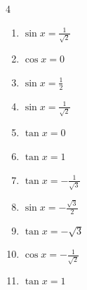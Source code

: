 \begin{multicols}{4}
\begin{enumerate}

  \item $\displaystyle \sin{x}  = \frac{1}{\sqrt{2}}$


  \item $\displaystyle \cos{x}  = 0$


  \item $\displaystyle \sin{x}  = \frac{1}{2}$


  \item $\displaystyle \sin{x}  = \frac{1}{\sqrt{2}}$


  \item $\displaystyle \tan{x}  = 0$

        \phantom{$\displaystyle x = 0 , \pi$}

  \item $\displaystyle \tan{x}  = 1$


\columnbreak %

  \item $\displaystyle \tan{x}  = -\frac{1}{\sqrt{3}}$


  \item $\displaystyle \sin{x}  = -\frac{\sqrt{3}}{2}$


  \item $\displaystyle \tan{x}  = -\sqrt{3}$


  \item $\displaystyle \cos{x}  = -\frac{1}{\sqrt{2}}$


  \item $\displaystyle \tan{x}  = 1$


\end{enumerate}
\end{multicols}
